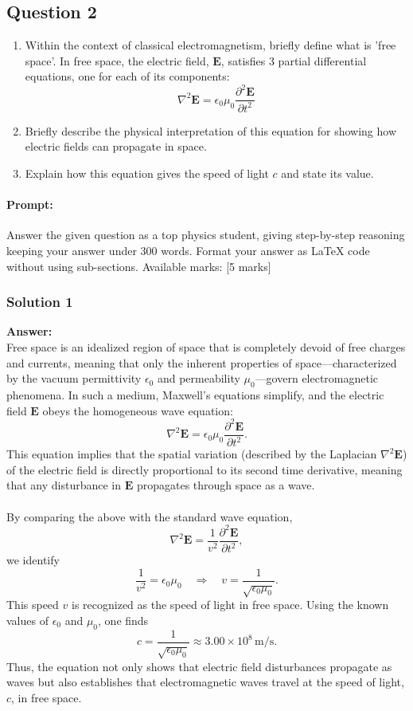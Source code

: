 \documentclass{article}
\begin{document}
\subsection{Question 2}
\begin{enumerate}
    \item Within the context of classical electromagnetism, briefly define what is 'free space'. In free space, the electric field, $\mathbf{E}$, satisfies 3 partial differential equations, one for each of its components:
    \[
    \nabla^2 \mathbf{E} = \epsilon_0 \mu_0 \frac{\partial^2 \mathbf{E}}{\partial t^2}
    \]
    \item Briefly describe the physical interpretation of this equation for showing how electric fields can propagate in space.
    \item Explain how this equation gives the speed of light $c$ and state its value.
\end{enumerate}


\paragraph{Prompt: \\} 
Answer the given question as a top physics student, giving step-by-step reasoning keeping your answer under 300 words. Format your answer as LaTeX code without using sub-sections. Available marks: [5 marks]

\subsubsection{Solution 1}
\textbf{Answer:} \\
Free space is an idealized region of space that is completely devoid of free charges and currents, meaning that only the inherent properties of space—characterized by the vacuum permittivity $\epsilon_0$ and permeability $\mu_0$—govern electromagnetic phenomena. In such a medium, Maxwell's equations simplify, and the electric field $\mathbf{E}$ obeys the homogeneous wave equation:
\[
\nabla^2 \mathbf{E} = \epsilon_0 \mu_0 \frac{\partial^2 \mathbf{E}}{\partial t^2}.
\]
This equation implies that the spatial variation (described by the Laplacian $\nabla^2 \mathbf{E}$) of the electric field is directly proportional to its second time derivative, meaning that any disturbance in $\mathbf{E}$ propagates through space as a wave. \\
\\
By comparing the above with the standard wave equation,
\[
\nabla^2 \mathbf{E} = \frac{1}{v^2} \frac{\partial^2 \mathbf{E}}{\partial t^2},
\]
we identify
\[
\frac{1}{v^2} = \epsilon_0 \mu_0 \quad \Rightarrow \quad v = \frac{1}{\sqrt{\epsilon_0 \mu_0}}.
\]
This speed $v$ is recognized as the speed of light in free space. Using the known values of $\epsilon_0$ and $\mu_0$, one finds
\[
c = \frac{1}{\sqrt{\epsilon_0 \mu_0}} \approx 3.00 \times 10^8 \, \text{m/s}.
\]
Thus, the equation not only shows that electric field disturbances propagate as waves but also establishes that electromagnetic waves travel at the speed of light, $c$, in free space.
\end{document}
